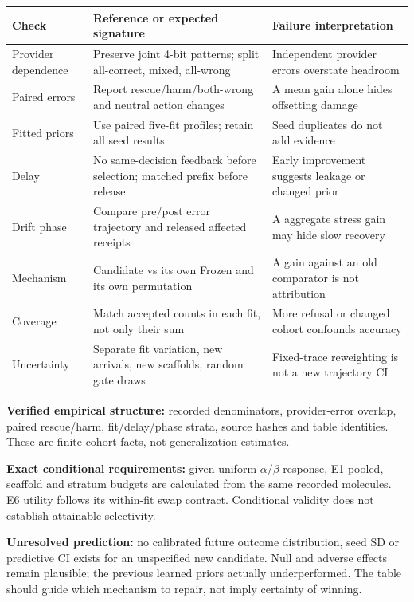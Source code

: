\documentclass[10pt,letterpaper]{article}
\newcommand{\sect}[1]{\vspace{5pt}{\large\bfseries #1}\par\vspace{2pt}}
\newenvironment{clean}{\begin{center}\fontsize{9.5}{11.5}\selectfont\setlength{\tabcolsep}{6pt}\renewcommand{\arraystretch}{1.06}}{\end{center}}
\begin{document}
\newpage
\sect{Distribution checks for the scientist}
\begin{clean}\begin{tabular}{@{}p{.20\linewidth}p{.39\linewidth}p{.32\linewidth}@{}}
\toprule
Check & Reference or expected signature & Failure interpretation \\
\midrule
Provider dependence & Preserve joint 4-bit patterns; split all-correct, mixed, all-wrong & Independent provider errors overstate headroom \\
Paired errors & Report rescue/harm/both-wrong and neutral action changes & A mean gain alone hides offsetting damage \\
Fitted priors & Use paired five-fit profiles; retain all seed results & Seed duplicates do not add evidence \\
Delay & No same-decision feedback before selection; matched prefix before release & Early improvement suggests leakage or changed prior \\
Drift phase & Compare pre/post error trajectory and released affected receipts & A aggregate stress gain may hide slow recovery \\
Mechanism & Candidate vs its own Frozen and its own permutation & A gain against an old comparator is not attribution \\
Coverage & Match accepted counts in each fit, not only their sum & More refusal or changed cohort confounds accuracy \\
Uncertainty & Separate fit variation, new arrivals, new scaffolds, random gate draws & Fixed-trace reweighting is not a new trajectory CI \\
\bottomrule
\end{tabular}\end{clean}
\sect{What has high-confidence support, and what still needs evidence}
\textbf{Verified empirical structure:} recorded denominators, provider-error overlap, paired rescue/harm,
fit/delay/phase strata, source hashes and table identities. These are finite-cohort facts, not generalization estimates.

\textbf{Exact conditional requirements:} given uniform $\alpha/\beta$ response, E1 pooled,
scaffold and stratum budgets are calculated from the same recorded molecules. E6 utility follows its
within-fit swap contract. Conditional validity does not establish attainable selectivity.

\textbf{Unresolved prediction:} no calibrated future outcome distribution, seed SD or predictive CI exists
for an unspecified new candidate. Null and adverse effects remain plausible; the previous learned
priors actually underperformed. The table should guide which mechanism to repair, not imply certainty of winning.
\end{document}
